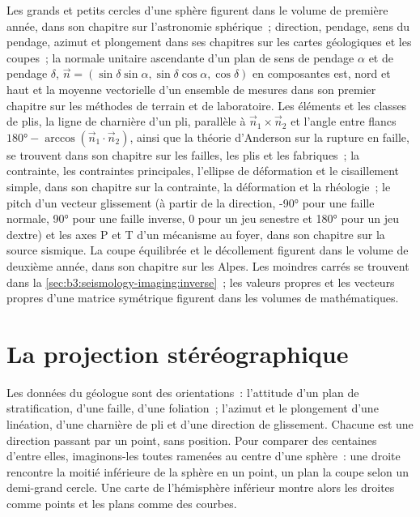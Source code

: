 \begin{recall}
Les grands et petits cercles d'une sphère figurent dans le volume de première année, dans son chapitre
sur l'astronomie sphérique~; direction, pendage, sens du pendage, azimut et plongement dans ses
chapitres sur les cartes géologiques et les coupes~; la normale unitaire ascendante
d'un plan de sens de pendage $\alpha$ et de pendage $\delta$, $\vec n = (\sin\delta
\sin\alpha, \sin\delta\cos\alpha, \cos\delta)$ en composantes est, nord et haut
et la moyenne vectorielle d'un ensemble de mesures dans son premier chapitre sur
les méthodes de terrain et de laboratoire. Les éléments et les classes de plis, la ligne de charnière
d'un pli, parallèle à $\vec n_1\times\vec n_2$ et l'angle entre flancs
$\ang{180} - \arccos(\vec n_1\cdot\vec n_2)$, ainsi que la théorie d'Anderson
sur la rupture en faille, se trouvent dans son chapitre sur les failles, les plis et les fabriques~; la contrainte, les
contraintes principales, l'ellipse de déformation et le cisaillement simple, dans son chapitre sur
la contrainte, la déformation et la rhéologie~; le pitch d'un vecteur glissement (à partir de la direction,
\ang{-90} pour une faille normale, \ang{90} pour une faille inverse, 0 pour un jeu senestre et
\ang{180} pour un jeu dextre) et les axes P et T d'un mécanisme au foyer, dans son chapitre sur
la source sismique. La coupe équilibrée et le décollement figurent dans
le volume de deuxième année, dans son chapitre sur les Alpes. Les moindres carrés se trouvent dans
la \cref{sec:b3:seismology-imaging:inverse}~; les valeurs propres et les vecteurs propres
d'une matrice symétrique figurent dans les volumes de mathématiques.
\end{recall}

\section{La projection stéréographique}\label{sec:b3:structural-analysis:stereo}

Les données du géologue sont des orientations~: l'attitude d'un plan de stratification, d'une
faille, d'une foliation~; l'azimut et le plongement d'une linéation, d'une charnière de pli et d'une
direction de glissement. Chacune est une direction passant par un point, sans position. Pour
comparer des centaines d'entre elles, imaginons-les toutes ramenées au centre d'une sphère~:
une droite rencontre la moitié inférieure de la sphère en un point, un plan la coupe selon
un demi-grand cercle. Une carte de l'hémisphère inférieur montre alors les droites comme
points et les plans comme des courbes.

